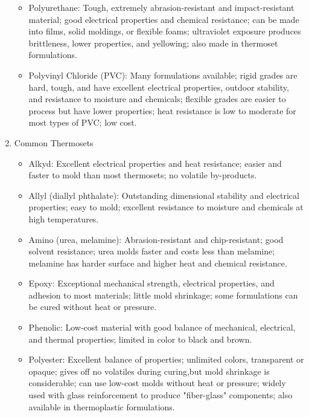 \documentclass[a4paper,openany,12pt]{book}
\begin{document}
\begin{enumerate}
\begin{itemize}
\item Polyurethane: Tough, extremely abrasion-resistant and impact-resistant
material; good electrical properties and chemical resistance; can be
made into films, solid moldings, or flexible foams; ultraviolet
exposure produces brittleness, lower properties, and yellowing; also
made in thermoset formulations.

\item Polyvinyl Chloride (PVC): Many formulations available; rigid grades
are hard, tough, and have excellent electrical properties, outdoor
stability, and resistance to moisture and chemicals; flexible grades
are easier to process but have lower properties; heat resistance is
low to moderate for most types of PVC; low cost.
\end{itemize}

\item Common Thermosets
\label{sec:orgdbf7347}
\begin{itemize}
\item Alkyd: Excellent electrical properties and heat resistance; easier and
faster to mold than most thermosets; no volatile by-products.

\item Allyl (diallyl phthalate): Outstanding dimensional stability and
electrical properties; easy to mold; excellent resistance to moisture
and chemicals at high temperatures.

\item Amino (urea, melamine): Abrasion-resistant and chip-resistant; good
solvent resistance; urea molds faster and costs less than melamine;
melamine has harder surface and higher heat and chemical resistance.

\item Epoxy: Exceptional mechanical strength, electrical properties, and
adhesion to most materials; little mold shrinkage; some formulations
can be cured without heat or pressure.

\item Phenolic: Low-cost material with good balance of mechanical,
electrical, and thermal properties; limited in color to black and
brown.

\item Polyester: Excellent balance of properties; unlimited colors,
transparent or opaque; gives off no volatiles during curing,but mold
shrinkage is considerable; can use low-cost molds without heat or
pressure; widely used with glass reinforcement to produce
"fiber-glass" components; also available in thermoplastic
formulations.


\end{itemize}
\end{enumerate}
\end{document}
